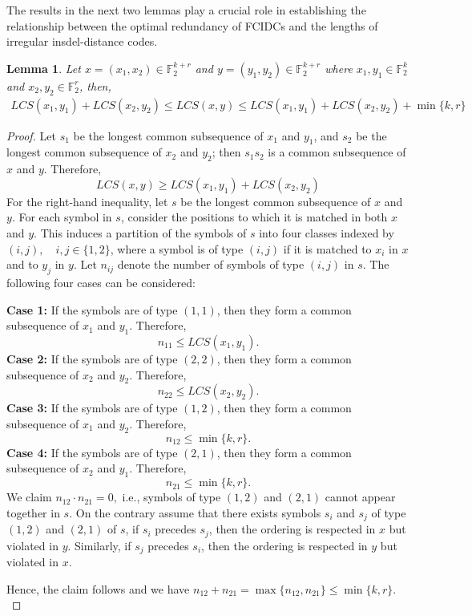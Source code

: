 \documentclass[11 pt]{article}
\numberwithin{equation}{section}
\newtheorem{lemma}[theorem]{Lemma}
\begin{document}
    The results in the next two lemmas play a crucial role in establishing the relationship between the optimal redundancy of FCIDCs and the lengths of irregular insdel-distance codes.
     
    \begin{lemma}
        Let $x = (x_1, x_2) \in \mathbb{F}_2^{k+r}$ and $y = (y_1, y_2) \in \mathbb{F}_2^{k+r}$ where $x_1, y_1 \in \mathbb{F}_2^k$ and $x_2, y_2 \in  \mathbb{F}_2^r$, then, 
        \begin{equation}\label{lcs_inequality}  
        \begin{multlined}
            LCS(x_1, y_1) + LCS(x_2, y_2) \leq LCS(x,y) \leq LCS(x_1, y_1) + LCS(x_2, y_2) + \min\{k,r\}
        \end{multlined}           
        \end{equation}    
    \end{lemma}    
    
    \begin{proof}
        Let $s_1$ be the longest common subsequence of $x_1$ and $y_1$, and $s_2$ be the longest common subsequence of $x_2$ and $y_2$; then $s_1s_2$ is a common subsequence of $x$ and $y$. Therefore,
        \begin{equation*}
            LCS(x,y) \geq LCS(x_1, y_1) + LCS(x_2, y_2)
        \end{equation*}
        For the right-hand inequality, let $s$ be the longest common subsequence of $x$ and $y$. For each symbol in $s$, consider the positions to which it is matched in both $x$ and $y$. This induces a partition of the symbols of $s$ into four classes indexed by $(i,j), \quad i,j \in \{1,2\}$, where a symbol is of type $(i,j)$ if it is matched to $x_i$ in  $x$ and to $y_j$ in $y$. Let $n_{ij}$ denote the number of symbols of type $(i,j)$ in $s$. The following four cases can be considered:
        
        \noindent\textbf{Case 1:} If the symbols are of type $(1,1)$, then they form a common subsequence of $x_1$ and $y_1$. Therefore,
        \[
            n_{11} \leq LCS(x_1,y_1).
        \]
        \textbf{Case 2:} If the symbols are of type $(2,2)$, then they form a common subsequence of $x_2$ and $y_2$. Therefore,
        \[
            n_{22} \leq LCS(x_2,y_2).
        \]
        \textbf{Case 3:} If the symbols are of type $(1,2)$, then they form a common subsequence of $x_1$ and $y_2$. Therefore,
        \[
            n_{12} \leq \min\{k,r\}.
        \]
        \textbf{Case 4:} If the symbols are of type $(2,1)$, then they form a common subsequence of $x_2$ and $y_1$. Therefore,
        \[
            n_{21} \leq \min \{k,r\}.
        \]
        We claim $n_{12}\cdot n_{21} = 0,$ i.e., symbols of type $(1,2)$ and $(2,1)$ cannot appear together in $s$.
        On the contrary assume that there exists symbols $s_i$ and $s_j$ of type $(1,2)$ and $(2,1)$ of $s$, if $s_i$ precedes $s_j$, then the ordering is respected in $x$ but violated in $y$. Similarly, if $s_j$ precedes $s_i$, then the ordering is respected in $y$ but violated in $x$.
        
        \noindent Hence, the claim follows and we have $n_{12} + n_{21} = \max\{n_{12}, n_{21}\} \leq \min \{k,r\}.$
    \end{proof}
    
\end{document}
